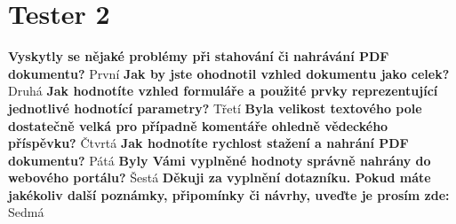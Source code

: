 \section{Tester 2}

\textbf{Vyskytly se nějaké problémy při stahování či nahrávání PDF dokumentu?}
\newline
První
\newline
\newline
\textbf{Jak by jste ohodnotil vzhled dokumentu jako celek?}
\newline
Druhá
\newline
\newline
\textbf{Jak hodnotíte vzhled formuláře a použité prvky reprezentující jednotlivé hodnotící parametry?}
\newline
Třetí
\newline
\newline
\textbf{Byla velikost textového pole dostatečně velká pro případně komentáře ohledně vědeckého příspěvku?}
\newline
Čtvrtá
\newline
\newline
\textbf{Jak hodnotíte rychlost stažení a nahrání PDF dokumentu?} 
\newline
Pátá
\newline
\newline
\textbf{Byly Vámi vyplněné hodnoty správně nahrány do webového portálu?}
\newline
Šestá
\newline
\newline
\textbf{Děkuji za vyplnění dotazníku. Pokud máte jakékoliv další poznámky, připomínky či návrhy, uveďte je prosím zde:}
\newline
Sedmá
\newpage 
